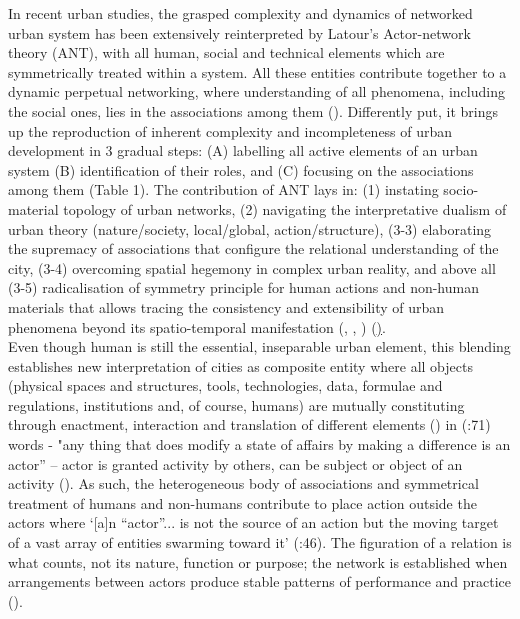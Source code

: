 \documentclass[11pt]{report}
\begin{document}
In recent urban studies, the grasped complexity and dynamics of networked urban system has been extensively reinterpreted by Latour’s Actor-network theory (ANT), with all human, social and technical elements which are symmetrically treated within a system. All these entities contribute together to a dynamic perpetual networking, where understanding of all phenomena, including the social ones, lies in the associations among them  (\href{Latour}{\citealt{latour_reassembling_2005}}). Differently put, it brings up the reproduction of inherent complexity and incompleteness of urban development in 3 gradual steps:  (A) labelling all active elements of an urban system (B) identification of their roles, and (C) focusing on the associations among them (Table 1). The contribution of ANT lays in: (1) instating socio-material topology of urban networks, (2) navigating the interpretative dualism of urban theory (nature/society, local/global, action/structure), (3-3) elaborating the supremacy of associations that configure the relational understanding of the city, (3-4) overcoming spatial hegemony in complex urban reality, and above all (3-5) radicalisation of  symmetry principle for human  actions  and non-human  materials  that  allows tracing the consistency and extensibility of urban phenomena beyond its spatio-temporal manifestation  (\href{Latour}{\citealt{latour_we_1993}}, \href{Murdoch}{\citealt{murdoch_spaces_1998}}, \href{Farias}{\citealt{farias_introduction:_2011}}) (\href{Table 1}).
\\

Even though human is still the essential, inseparable urban element, this blending establishes new interpretation of cities as composite entity where all objects (physical spaces and structures, tools, technologies, data, formulae and regulations, institutions and, of course, humans) are mutually constituting through enactment, interaction and translation of different elements (\href{Farias}{\citealt{farias_introduction:_2011}}) in  (\href{Latour}{\citealt{latour_reassembling_2005}}:71) words - "any thing that does modify a state of affairs by making a difference is an actor” – actor is granted activity by others, can be subject or object of an activity  (\href{Latour}{\citealt{latour_actor-network_1996}}). As such, the heterogeneous body of associations and symmetrical treatment of humans and non-humans contribute to place action outside the actors where ‘[a]n “actor”... is not the source of an action but the moving target of a vast array of entities swarming toward it’ (\href{Latour}{\citealt{latour_reassembling_2005}}:46). The figuration of a relation is what counts, not its nature, function or purpose; the network is established when arrangements between actors produce stable patterns of performance and practice (\href{Smith}{\citealt{smith_world_2003}}).
\\
\end{document}
